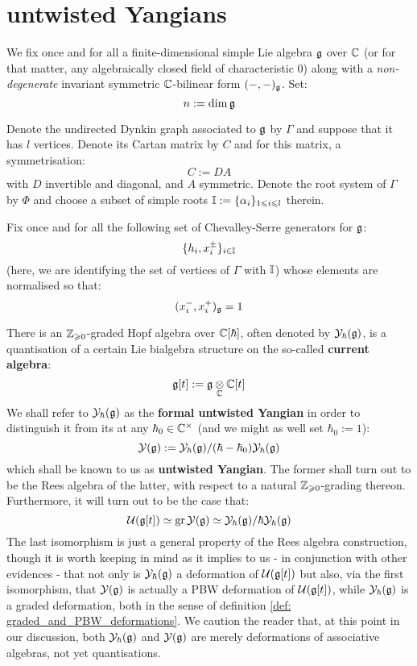 \section{untwisted Yangians}
    \begin{convention} \label{conv: a_fixed_semi_simple_lie_algebra}
        We fix once and for all a finite-dimensional simple Lie algebra $\mathfrak{g}$ over $\mathbb{C}$ (or for that matter, any algebraically closed field of characteristic $0$) along with a \textit{non-degenerate} invariant symmetric $\mathbb{C}$-bilinear form $(-, -)_{\mathfrak{g}}$. Set:
            $$n := \dim \mathfrak{g}$$
            
        Denote the undirected Dynkin graph associated to $\mathfrak{g}$ by $\Gamma$ and suppose that it has $l$ vertices. Denote its Cartan matrix by $C$ and for this matrix, a symmetrisation:
            $$C := DA$$
        with $D$ invertible and diagonal, and $A$ symmetric. Denote the root system of $\Gamma$ by $\Phi$ and choose a subset of simple roots $\mathbb{I} := \{\alpha_i\}_{1 \leqslant i \leqslant l}$ therein. 
        
        Fix once and for all the following set of Chevalley-Serre generators for $\mathfrak{g}$:
            $$\{h_i, x_i^{\pm}\}_{i \in \mathbb{I}}$$
        (here, we are identifying the set of vertices of $\Gamma$ with $\mathbb{I}$) whose elements are normalised so that:
            $$(x_i^-, x_i^+)_{\mathfrak{g}} = 1$$
    \end{convention}

    There is an $\mathbb{Z}_{\geqslant 0}$-graded Hopf algebra over $\mathbb{C}[\hbar]$, often denoted by $\mathcal{Y}_{\hbar}(\mathfrak{g})$, is a quantisation of a certain Lie bialgebra structure on the so-called \textbf{current algebra}:
        $$\g[t] := \g \tensor_{\bbC} \bbC[t]$$
    We shall refer to $\mathcal{Y}_{\hbar}(\mathfrak{g})$ as the \textbf{formal untwisted Yangian} in order to distinguish it from its  at any $\hbar_0 \in \bbC^{\x}$ (and we might as well set $\hbar_0 := 1$):
        $$\mathcal{Y}(\mathfrak{g}) := \mathcal{Y}_{\hbar}(\mathfrak{g})/(\hbar - \hbar_0)\mathcal{Y}_{\hbar}(\mathfrak{g})$$
    which shall be known to us as  \textbf{untwisted Yangian}. The former shall turn out to be the Rees algebra of the latter, with respect to a natural $\mathbb{Z}_{\geqslant 0}$-grading thereon. Furthermore, it will turn out to be the case that:
        $$\mathcal{U}( \mathfrak{g}[t] ) \simeq \operatorname{gr} \mathcal{Y}(\mathfrak{g}) \simeq \mathcal{Y}_{\hbar}(\mathfrak{g})/\hbar\mathcal{Y}_{\hbar}(\mathfrak{g})$$
    The last isomorphism is just a general property of the Rees algebra construction, though it is worth keeping in mind as it implies to us - in conjunction with other evidences - that not only is $\mathcal{Y}_{\hbar}(\mathfrak{g})$ a deformation of $\mathcal{U}( \mathfrak{g}[t] )$ but also, via the first isomorphism, that $\mathcal{Y}(\mathfrak{g})$ is actually a PBW deformation of $\mathcal{U}( \mathfrak{g}[t] )$, while $\mathcal{Y}_{\hbar}(\mathfrak{g})$ is a graded deformation, both in the sense of definition \ref{def: graded_and_PBW_deformations}. We caution the reader that, at this point in our discussion, both $\mathcal{Y}_{\hbar}(\mathfrak{g})$ and $\mathcal{Y}(\mathfrak{g})$ are merely deformations of associative algebras, not yet quantisations. 

